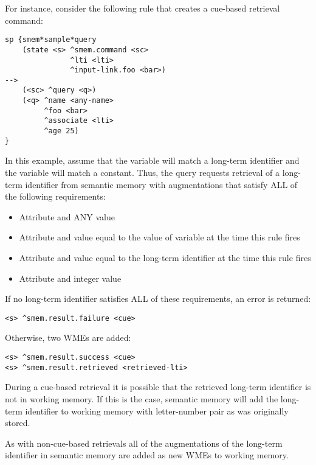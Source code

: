 For instance, consider the following rule that creates a cue-based retrieval command:

\begin{verbatim}
sp {smem*sample*query
    (state <s> ^smem.command <sc>
               ^lti <lti>
               ^input-link.foo <bar>)
-->
    (<sc> ^query <q>)
    (<q> ^name <any-name>
         ^foo <bar>
         ^associate <lti>
         ^age 25)
}
\end{verbatim}

In this example, assume that the  variable will match a long-term identifier and the  variable will match a constant.  
Thus, the query requests retrieval of a long-term identifier from semantic memory with augmentations that satisfy ALL of the following requirements:

\begin{itemize}

\item 
Attribute  and ANY value

\item 
Attribute  and value equal to the value of variable  at the time this rule fires

\item 
Attribute  and value equal to the long-term identifier  at the time this rule fires

\item 
Attribute  and integer value 

\end{itemize}

If no long-term identifier satisfies ALL of these requirements, an error is returned:

\begin{verbatim}
<s> ^smem.result.failure <cue>
\end{verbatim}

Otherwise, two WMEs are added:

\begin{verbatim}
<s> ^smem.result.success <cue>
<s> ^smem.result.retrieved <retrieved-lti>
\end{verbatim}

During a cue-based retrieval it is possible that the retrieved long-term identifier is not in working memory.  
If this is the case, semantic memory will add the long-term identifier to working memory with letter-number pair as was originally stored.

As with non-cue-based retrievals all of the augmentations of the long-term identifier in semantic memory are added as new WMEs to working memory.

